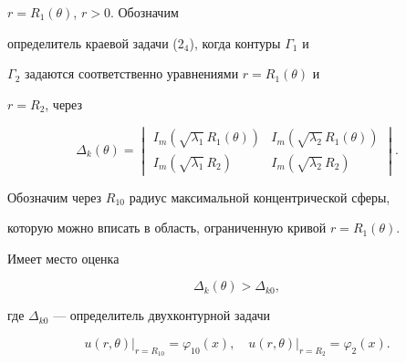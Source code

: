 $r=R_1(\theta)$, $r>0$. Обозначим 


определитель краевой задачи (2${}_4$), когда контуры $\Gamma_1$ и 


$\Gamma_2$ задаются соответственно уравнениями $r=R_1(\theta)$ и 


$r=R_2$, через


$$ 


\Delta_k(\theta)= 


\begin{vmatrix} 


I_m(\sqrt{\lambda_1}\,R_1(\theta)) &  


I_m(\sqrt{\lambda_2}\,R_1(\theta)) \\ 


I_m(\sqrt{\lambda_1}\,R_2) & I_m(\sqrt{\lambda_2}\,R_2) 


\end{vmatrix} 


. 


$$ 


 


Обозначим через $R_{10}$ радиус максимальной концентрической сферы, 


которую можно вписать в область, ограниченную кривой $r=R_1(\theta)$. 


 


\begin{lemnonum} 


Имеет место оценка 


$$ 


\Delta_k(\theta)>\Delta_{k0},


$$ 


где $\Delta_{k0}$ --- определитель двухконтурной задачи 


$$ 


u(r,\theta)\big|_{r=R_{10}}=\varphi_{10}(x),\quad 


u(r,\theta)\big|_{r=R_2}=\varphi_2(x). 


$$ 


\end{lemnonum} 


 



